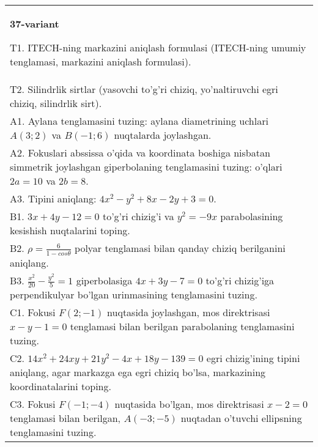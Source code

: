 \documentclass{article}
\begin{document}
\begin{tabular}{m{17cm}}
\textbf{37-variant}
\newline

T1. ITECH-ning markazini aniqlash formulasi (ITECH-ning umumiy tenglamasi, markazini aniqlash formulasi).\\

T2. Silindrlik sirtlar (yasovchi to'g'ri chiziq, yo'naltiruvchi egri chiziq, silindrlik sirt).\\

A1. Aylana tenglamasini tuzing: aylana diametrining uchlari $A(3;2)$ va $B(-1;6)$ nuqtalarda joylashgan.\\

A2. Fokuslari abssissa o'qida va koordinata boshiga nisbatan simmetrik joylashgan giperbolaning tenglamasini tuzing: o'qlari $2a=10$ va $2b=8$.\\

A3. Tipini aniqlang: $4x^{2}-y^{2}+8x-2y+3=0$.\\

B1. $3x + 4y - 12 = 0$ to'g'ri chizig'i va $y^{2} = - 9x$ parabolasining kesishish nuqtalarini toping.\\

B2. $\rho = \frac{6}{1 - cos\theta}$ polyar tenglamasi bilan qanday chiziq berilganini aniqlang.  \\

B3. $\frac{x^{2}}{20} - \frac{y^{2}}{5} = 1$ giperbolasiga $4x + 3y - 7 = 0$ to'g'ri chizig'iga perpendikulyar bo'lgan urinmasining tenglamasini tuzing.  \\

C1. Fokusi $F(2; - 1)$ nuqtasida joylashgan, mos direktrisasi $x - y - 1 = 0$ tenglamasi bilan berilgan parabolaning tenglamasini tuzing.  \\

C2. $14x^{2} + 24xy + 21y^{2} - 4x + 18y - 139 = 0$ egri chizig'ining tipini aniqlang, agar markazga ega egri chiziq bo'lsa, markazining koordinatalarini toping.  \\

C3. Fokusi $F( - 1; - 4)$ nuqtasida bo'lgan, mos direktrisasi $x - 2 = 0$ tenglamasi bilan berilgan, $A( - 3; - 5)$ nuqtadan o'tuvchi ellipsning tenglamasini tuzing.  \\

\end{tabular}
\vspace{1cm}
\end{document}

